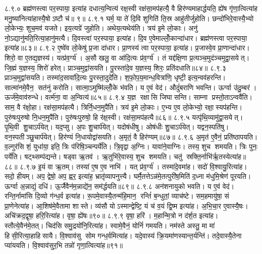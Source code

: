 ८.९.०
ब्रह्म॑णस्त्वा पर॒स्पाया॒ इत्या॑ह दधात्य॒न्वित्य॑ रक्ष॒स्वी रक्ष॑सा॒मप॑हत्यै॒ वै हिर॑ण्यमाहार्द्धयति॒ ह्ये॑ष गृ॑णा॒त्वित्या॑ह मनु॒ष्या॑नित्या॑हास्यै॒षोऽष्टौ च॑॥ ९॥
८.९.१
घर्म॒ या ते॑ दि॒वि शुगिति॑ ति॒स्र आहु॑तीर्जुहोति। छन्दो॑भिरे॒वास्यै॒भ्यो लो॒केभ्यः॒ शुच॒मव॑ यजते। इय॒त्यग्रे॑ जुहोति। अथेय॒त्यथेय॑ति। त्रय॑ इ॒मे लो॒काः। अनु॑ नो॒ऽद्यानु॑मति॒रित्या॒हानु॑मत्यै। दि॒वस्त्वा॑ पर॒स्पाया॒ इत्या॑ह। दि॒व ए॒वेमाल्लोँ॒कान्दा॑धार। ब्रह्म॑णस्त्वा पर॒स्पाया॒ इत्या॑ह॥८३॥
८.९.२
ए॒ष्वे॑व लो॒केषु॑ प्र॒जा दा॑धार। प्रा॒णस्य॑ त्वा पर॒स्पाया॒ इत्या॑ह। प्र॒जास्वे॒व प्रा॒णान्दा॑धार। शिरो॒ वा ए॒तद्य॒ज्ञस्य॑। यत्प्र॑व॒र्ग्य॑। अ॒सौ खलु॒ वा आ॑दि॒त्यः प्र॑व॒र्ग्य॑। तं यद्द॑क्षि॒णा प्र॒त्यञ्च॒मुद॑ञ्चमुद्वा॒सयेत्। जि॒ह्मं य॒ज्ञस्य॒ शिरो॑ हरेत्। प्राञ्च॒मुद्वा॑सयति। पु॒रस्ता॑दे॒व य॒ज्ञस्य॒ शिरः॒ प्रति॑दधाति॥८४॥
८.९.३
प्राञ्च॒मुद्वा॑सयति। तस्मा॑द॒सावा॑दि॒त्यः पु॒रस्ता॒दुदे॑ति। श॒फो॒प॒य॒मान्ध॒वित्रा॑णि॒ धृष्टी॒ इत्य॒न्वव॑हरन्ति। सात्मा॑नमे॒वैन॒ सत॑नुं करोति। सात्मा॒ऽमुष्मि॑ल्लोँ॒के भ॑वति। य ए॒वं वेद॑। औदुं॑बराणि भवन्ति। ऊर्ग्वा उ॑दु॒म्बर॑। ऊर्ज॑मे॒वाव॑रुन्धे। वर्त्म॑ना॒ वा अ॒न्वित्य॑॥८५॥
८.९.४
य॒ज्ञ रक्षासि जिघासन्ति। साम्ना प्रस्तो॒ताऽन्ववै॑ति। साम॒ वै र॑क्षो॒हा। रक्ष॑सा॒मप॑हत्यै। त्रिर्नि॒धन॒मुपै॑ति। त्रय॑ इ॒मे लो॒काः। ए॒भ्य ए॒व लो॒केभ्यो॒ रक्षा॒स्यप॑हन्ति। पुरु॑षःपुरुषो नि॒धन॒मुपै॑ति। पुरु॑षःपुरुषो॒ हि र॑क्ष॒स्वी। रक्ष॑सा॒मप॑हत्यै॥८६॥
८.९.५
यत्पृ॑थि॒व्यामु॑द्वा॒सयेत्। पृ॒थि॒वी शु॒चाऽर्प॑येत्। यद॒प्सु। अ॒पः  शु॒चार्प॑येत्। यदोष॑धीषु। ओष॑धीः  शु॒चाऽर्प॑येत्। यद्वन॒स्पति॑षु। वन॒स्पतीञ्छु॒चार्प॑येत्। हिर॑ण्यं नि॒धायोद्वा॑सयति। अ॒मृतं॒ वै हिर॑ण्यम्॥८७॥
८.९.६
अ॒मृत॑ ए॒वैनं॒ प्रति॑ष्ठापयति। व॒ल्गुर॑सि शं॒ युधा॑या॒ इति॒ त्रिः प॑रिषि॒ञ्चन्पर्ये॑ति। त्रि॒वृद्वा अ॒ग्निः। यावा॑ने॒वाग्निः। तस्य॒ शुच शमयति। त्रिः पुनः॒ पर्ये॑ति। षट्थ्सम्प॑द्यन्ते। षड्वा ऋ॒तव॑। ऋ॒तुभि॑रे॒वास्य॒ शुच शमयति। चतु॑ स्रक्ति॒र्नाभि॑र्\mbox{}ऋ॒तस्येत्या॑ह॥८८॥
८.९.७
इ॒यं वा ऋ॒तम्। तस्या॑ ए॒ष ए॒व नाभि॑। यत् प्र॑व॒र्ग्य॑। तस्मा॑दे॒वमा॑ह। सदो॑ वि॒श्वायु॒रित्या॑ह। सदो॒ हीयम्। अप॒ द्वेषो॒ अप॒ ह्वर॒ इत्या॑ह॒ भ्रातृ॑व्यापनुत्त्यै। घर्मै॒तत्तेऽन्न॑मे॒तत्पुरी॑ष॒मिति॑ द॒ध्ना म॑धुमि॒श्रेण॑ पूरयति। ऊर्ग्वा अ॒न्नाद्यं॒ दधि॑। ऊ॒र्जैवैन॑म॒न्नाद्ये॑न॒ सम॑र्द्धयति॥८९॥
८.९.८
अन॑शनायुको भवति। य ए॒वं वेद॑। रन्ति॒र्नामा॑सि दि॒व्यो ग॑न्ध॒र्व इत्या॑ह। रू॒पमे॒वास्यै॒तन्म॑हि॒मान॒ रन्तिं॑ ब॒न्धुतां॒ व्याच॑ष्टे। सम॒हमायु॑षा॒ सं प्रा॒णेनेत्या॑ह। आ॒शिष॑मे॒वैतामा शास्ते। व्य॑सौ योऽस्मान्द्वेष्टि॒ यं च॑ व॒यं द्वि॒ष्म इत्या॑ह। अ॒भि॒चा॒र ए॒वास्यै॒षः। अचि॑क्रद॒द्वृषा॒ हरि॒रित्या॑ह। वृषा॒ ह्ये॑षः॥९०॥
८.९.९
वृषा॒ हरि॑। म॒हान्मि॒त्रो न द॑र्\mbox{}श॒त इत्या॑ह। स्तौत्ये॒वैन॑मे॒तत्। चिद॑सि समु॒द्रयो॑नि॒रित्या॑ह। स्वामे॒वैनं॒ योनिं॑ गमयति। नम॑स्ते अस्तु॒ मा मा॑ हिसी॒रित्या॒हाहिसायै। वि॒श्वाव॑सु सोम गन्ध॒र्वमित्या॑ह। यदे॒वास्य॑ क्रि॒यमा॑णस्यान्त॒र्यन्ति॑। तदे॒वास्यै॒तेना प्या॑ययति। वि॒श्वाव॑सुर॒भि तन्नो॑ गृणा॒त्वित्या॑ह॥९१॥

